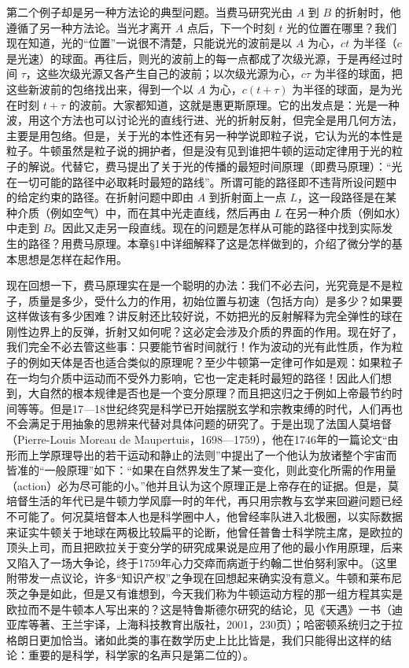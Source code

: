 第二个例子却是另一种方法论的典型问题。当费马研究光由 $A$ 到 $B$ 的折射时，他遵循了另一种方法论。当光才离开 $A$ 点后，下一个时刻 $t$ 光的位置在哪里？我们现在知道，光的“位置”一说很不清楚，只能说光的波前是以 $A$ 为心，$ct$ 为半径（$c$ 是光速）的球面。再往后，则光的波前上的每一点都成了次级光源，于是再经过时间 $\tau$，这些次级光源又各产生自己的波前；以次级光源为心，$c\tau$ 为半径的球面，把这些新波前的包络找出来，得到一个以 $A$ 为心，$c(t+\tau)$ 为半径的球面，是为光在时刻 $t+\tau$ 的波前。大家都知道，这就是惠更斯原理。它的出发点是：光是一种波，用这个方法也可以讨论光的直线行进、光的折射反射，但完全是用几何方法，主要是用包络。但是，关于光的本性还有另一种学说即粒子说，它认为光的本性是粒子。牛顿虽然是粒子说的拥护者，但是没有见到谁把牛顿的运动定律用于光的粒子的解说。代替它，费马提出了关于光的传播的最短时间原理（即费马原理）：“光在一切可能的路径中必取耗时最短的路线”。所谓可能的路径即不违背所设问题中的给定约束的路径。在折射问题中即由 $A$ 到折射面上一点 $L$，这一段路径是在某种介质（例如空气）中，而在其中光走直线，然后再由 $L$ 在另一种介质（例如水）中走到 $B$。因此又走另一段直线。现在的问题是怎样从可能的路径中找到实际发生的路径？用费马原理。本章§1中详细解释了这是怎样做到的，介绍了微分学的基本思想是怎样在起作用。

现在回想一下，费马原理实在是一个聪明的办法：我们不必去问，光究竟是不是粒子，质量是多少，受什么力的作用，初始位置与初速（包括方向）是多少？如果要这样做该有多少困难？讲反射还比较好说，不妨把光的反射解释为完全弹性的球在刚性边界上的反弹，折射又如何呢？这必定会涉及介质的界面的作用。现在好了，我们完全不必去管这些事：只要能节省时间就行！作为波动的光有此性质，作为粒子的例如天体是否也适合类似的原理呢？至少牛顿第一定律可作如是观：如果粒子在一均匀介质中运动而不受外力影响，它也一定走耗时最短的路径！因此人们想到，大自然的根本规律是否也是一个变分原理？而且把这归之于例如上帝最节约时间等等。但是17—18世纪终究是科学已开始摆脱玄学和宗教束缚的时代，人们再也不会满足于用抽象的思辨来代替对具体问题的研究了。于是出现了法国人莫培督（Pierre-Louis Moreau de Maupertuis，1698—1759），他在1746年的一篇论文“由形而上学原理导出的若干运动和静止的法则”中提出了一个他认为放诸整个宇宙而皆准的“一般原理”如下：“如果在自然界发生了某一变化，则此变化所需的作用量（action）必为尽可能的小。”他并且认为这个原理正是上帝存在的证据。但是，莫培督生活的年代已是牛顿力学风靡一时的年代，再只用宗教与玄学来回避问题已经不可能了。何况莫培督本人也是科学圈中人，他曾经率队进入北极圈，以实际数据来证实牛顿关于地球在两极比较扁平的论断，他曾任普鲁士科学院主席，是欧拉的顶头上司，而且把欧拉关于变分学的研究成果说是应用了他的最小作用原理，后来又陷入了一场大争论，终于1759年心力交瘁而病逝于约翰二世伯努利家中。（这里附带发一点议论，许多“知识产权”之争现在回想起来确实没有意义。牛顿和莱布尼茨之争是如此，但是又有谁想到，今天我们称为牛顿运动方程的那一组方程其实是欧拉而不是牛顿本人写出来的？这是特鲁斯德尔研究的结论，见《天遇》一书（迪亚库等著、王兰宇译，上海科技教育出版社，2001，230页）；哈密顿系统归之于拉格朗日更加恰当。诸如此类的事在数学历史上比比皆是，我们只能得出这样的结论：重要的是科学，科学家的名声只是第二位的）。

